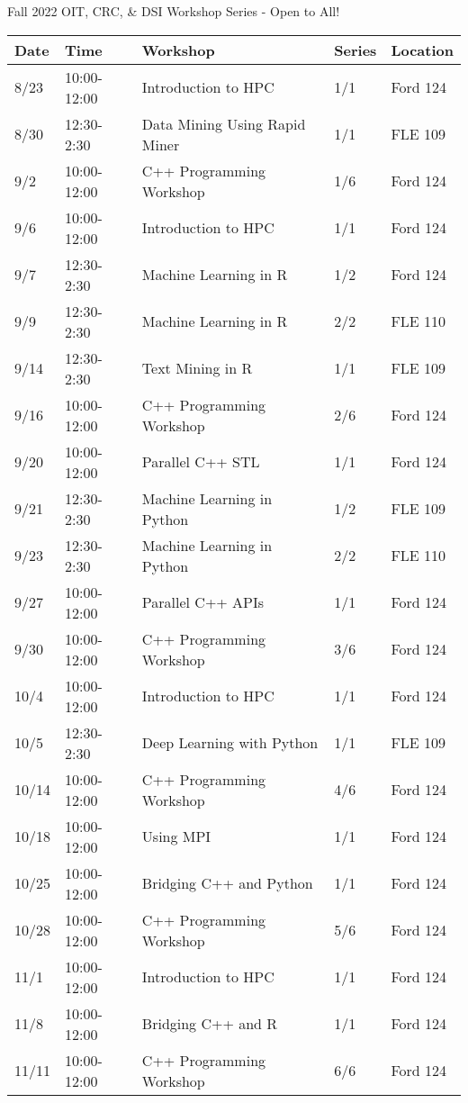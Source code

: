 \begin{frame}{Fall 2022 OIT, CRC, \& DSI Workshop Series - Open to All!}
\begin{table}
\tiny
\begin{tabular}{lllll}
\toprule
Date  & Time        & Workshop                      & Series & Location \\
\midrule
8/23  & 10:00-12:00 & Introduction to HPC           & 1/1    & Ford 124 \\
8/30  & 12:30-2:30  & Data Mining Using Rapid Miner & 1/1    & FLE 109  \\
9/2   & 10:00-12:00 & C++ Programming Workshop      & 1/6    & Ford 124 \\
9/6   & 10:00-12:00 & Introduction to HPC           & 1/1    & Ford 124 \\
9/7   & 12:30-2:30  & Machine Learning in R         & 1/2    & Ford 124 \\
9/9   & 12:30-2:30  & Machine Learning in R         & 2/2    & FLE 110  \\
9/14  & 12:30-2:30  & Text Mining in R              & 1/1    & FLE 109  \\
9/16  & 10:00-12:00 & C++ Programming Workshop      & 2/6    & Ford 124 \\
9/20  & 10:00-12:00 & Parallel C++ STL              & 1/1    & Ford 124 \\
9/21  & 12:30-2:30  & Machine Learning in Python    & 1/2    & FLE 109  \\
9/23  & 12:30-2:30  & Machine Learning in Python    & 2/2    & FLE 110  \\
9/27  & 10:00-12:00 & Parallel C++ APIs             & 1/1    & Ford 124 \\
9/30  & 10:00-12:00 & C++ Programming Workshop      & 3/6    & Ford 124 \\
10/4  & 10:00-12:00 & Introduction to HPC           & 1/1    & Ford 124 \\
10/5  & 12:30-2:30  & Deep Learning with Python     & 1/1    & FLE 109  \\
10/14 & 10:00-12:00 & C++ Programming Workshop      & 4/6    & Ford 124 \\
10/18 & 10:00-12:00 & Using MPI                     & 1/1    & Ford 124 \\
10/25 & 10:00-12:00 & Bridging C++ and Python       & 1/1    & Ford 124 \\
10/28 & 10:00-12:00 & C++ Programming Workshop      & 5/6    & Ford 124 \\
11/1  & 10:00-12:00 & Introduction to HPC           & 1/1    & Ford 124 \\
11/8  & 10:00-12:00 & Bridging C++ and R            & 1/1    & Ford 124 \\
11/11 & 10:00-12:00 & C++ Programming Workshop      & 6/6    & Ford 124 \\
\bottomrule
\end{tabular}
\end{table}
\end{frame}

